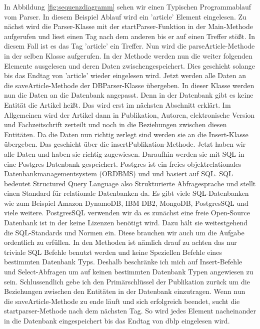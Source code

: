 In Abbildung \ref{fig:sequenzdiagramm} sehen wir einen Typischen Programmablauf vom Parser. In diesem Beispiel Ablauf wird ein 'article' Element eingelesen. Zu nächst wird die Parser-Klasse mit der startParser-Funktion in der Main-Methode aufgerufen und liest einen Tag nach dem anderen bis er auf einen Treffer stößt. In diesem Fall ist es das Tag 'article' ein Treffer. Nun wird die parseArticle-Methode in der selben Klasse aufgerufen. In der Methode werden nun die weiter folgenden Elemente ausgelesen und deren Daten zwischengespeichert. Dies geschieht solange bis das Endtag von 'article' wieder eingelesen wird. Jetzt werden alle Daten an die saveArticle-Methode der DBParser-Klasse übergeben. In dieser Klasse werden nun die Daten an die Datenbank angepasst. Denn in der Datenbank gibt es keine Entität die Artikel heißt. Das wird erst im nächsten Abschnitt erklärt. Im Allgemeinen wird der Artikel dann in Publikation, Autoren, elektronische Version und Fachzeitschrift zerteilt und noch in die Beziehungen zwischen diesen Entitäten. Da die Daten nun richtig zerlegt sind werden sie an die Insert-Klasse übergeben. Das geschieht über die insertPublikation-Methode. Jetzt haben wir alle Daten und haben sie richtig zugewiesen. Daraufhin werden sie mit SQL in eine Postgres Datenbank gespeichert. Postgres ist ein freies objektrelationales Datenbankmanagementsystem (ORDBMS) und und basiert auf SQL. SQL bedeutet Structured Query Language also Strukturierte Abfragesprache und stellt einen Standard für relationale Datenbanken da. Es gibt viele SQL-Datenbanken wie zum Beispiel Amazon DynamoDB, IBM DB2, MongoDB, PostgresSQL und viele weitere. PostgresSQL verwenden wir da es zunächst eine freie Open-Source Datenbank ist in der keine Lizenzen benötigt wird. Dazu hält sie weitestgehend die SQL-Standards und Normen ein. Diese brauchen wir auch um die Aufgabe ordentlich zu erfüllen. In den Methoden ist nämlich drauf zu achten das nur triviale SQL Befehle benutzt werden und keine Speziellen Befehle eines bestimmten Datenbank Typs. Deshalb beschränke ich mich auf Insert-Befehle und Select-Abfragen um auf keinen bestimmten Datenbank Typen angewiesen zu sein. Schlussendlich gebe ich den Primärschlüssel der Publikation zurück um die Beziehungen zwischen den Entitäten in der Datenbank einzutragen. Wenn nun die saveArticle-Methode zu ende läuft und sich erfolgreich beendet, sucht die startparser-Methode nach dem nächsten Tag. So wird jedes Element nacheinander in die Datenbank eingespeichert bis das Endtag von dblp eingelesen wird.

